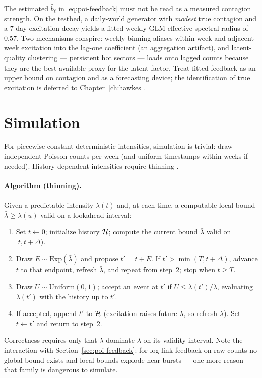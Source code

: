 \begin{remark}
\label{rem:poi-aggregation}
The estimated $\hat{b}_{\ell}$ in \eqref{eq:poi-feedback} must not be read as a measured
contagion strength. On the testbed, a daily-world generator with \emph{modest} true
contagion and a $7$-day excitation decay yields a fitted weekly-GLM effective spectral
radius of $0.57$. Two mechanisms conspire: weekly binning aliases within-week and
adjacent-week excitation into the lag-one coefficient (an aggregation artifact), and
latent-quality clustering --- persistent hot sectors --- loads onto lagged counts because
they are the best available proxy for the latent factor. Treat fitted feedback as an upper
bound on contagion and as a forecasting device; the identification of true excitation is
deferred to Chapter~\ref{ch:hawkes}.
\end{remark}

\section{Simulation}
\label{sec:poi-simulation}

For piecewise-constant deterministic intensities, simulation is trivial: draw independent
Poisson counts per week (and uniform timestamps within weeks if needed). History-dependent
intensities require thinning \cite{lewis1979}.

\paragraph{Algorithm (thinning).}
Given a predictable intensity $\lambda(t)$ and, at each time, a computable local bound
$\bar{\lambda} \ge \lambda(u)$ valid on a lookahead interval:
\begin{enumerate}
\item Set $t \leftarrow 0$; initialize history $\mathcal{H}$; compute the current bound
$\bar{\lambda}$ valid on $[t, t + \Delta)$.
\item Draw $E \sim \mathrm{Exp}(\bar{\lambda})$ and propose $t' = t + E$. If
$t' > \min(T, t + \Delta)$, advance $t$ to that endpoint, refresh $\bar{\lambda}$, and
repeat from step~2; stop when $t \ge T$.
\item Draw $U \sim \mathrm{Uniform}(0,1)$; accept an event at $t'$ if
$U \le \lambda(t') / \bar{\lambda}$, evaluating $\lambda(t')$ with the history up to
$t'$.
\item If accepted, append $t'$ to $\mathcal{H}$ (excitation raises future $\lambda$, so refresh
$\bar{\lambda}$). Set $t \leftarrow t'$ and return to step~2.
\end{enumerate}
Correctness requires only that $\bar{\lambda}$ dominate $\lambda$ on its validity
interval. Note the interaction with Section~\ref{sec:poi-feedback}: for log-link feedback
on raw counts no global bound exists and local bounds explode near bursts --- one more
reason that family is dangerous to simulate.

